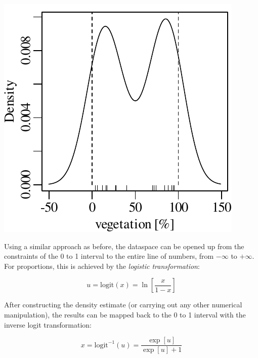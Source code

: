 \noindent\begin{minipage}[t][][b]{.3\textwidth}
  \includegraphics[width=\textwidth]{../figures/vegetationKDE.pdf}\medskip
\end{minipage}
\begin{minipage}[t][][t]{.7\textwidth}
  \label{fig:vegetationKDE}
\end{minipage}

Using a similar approach as before, the dataspace can be opened up
from the constraints of the 0 to 1 interval to the entire line of
numbers, from $-\infty$ to $+\infty$. For proportions, this is
achieved by the \emph{logistic transformation}:

\begin{equation}
  u = \mbox{logit}(x) = \ln\!\left[\frac{x}{1-x}\right]
  \label{eq:logit}
\end{equation}

After constructing the density estimate (or carrying out any other
numerical manipulation), the results can be mapped back to the 0 to 1
interval with the inverse logit transformation:

\begin{equation}
  x = \mbox{logit}^{-1}(u) = \frac{\exp[u]}{\exp[u]+1}
  \label{eq:invlogit}
\end{equation}

